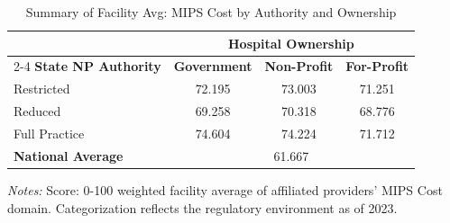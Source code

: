 \begin{table}[htbp]
    \centering
    \caption{Summary of Facility Avg: MIPS Cost by Authority and Ownership}
    \label{tab:mips_cost_score_own}
    \vspace{0.2cm}
    \begin{tabular}{lccc}
        \toprule
        & \multicolumn{3}{c}{\textbf{Hospital Ownership}} \\
        \cmidrule(lr){2-4}
        \textbf{State NP Authority} & \textbf{Government} & \textbf{Non-Profit} & \textbf{For-Profit} \\
        \midrule
        Restricted & 72.195 & 73.003 & 71.251 \\
        Reduced & 69.258 & 70.318 & 68.776 \\
        Full Practice & 74.604 & 74.224 & 71.712 \\
        \midrule
        \textbf{National Average} & \multicolumn{3}{c}{61.667} \\
        \bottomrule
    \end{tabular}
    \vspace{0.1cm}
    \begin{minipage}{0.85\textwidth}
        \footnotesize \textit{Notes:} Score: 0-100 weighted facility average of affiliated providers' MIPS Cost domain. Categorization reflects the regulatory environment as of 2023.
    \end{minipage}
\end{table}
